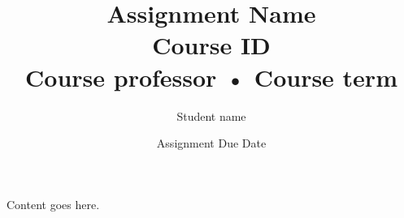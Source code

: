 \documentclass[letterpaper, 12pt]{article}
\newcommand{\noteCourseId}{Course ID}
\newcommand{\noteCourseProfessor}{Course professor}
\newcommand{\noteAuthor}{Student name}
\newcommand{\noteTerm}{Course term}
\begin{document}

\title{Assignment Name \\[0.25em]
	\normalsize\noteCourseId{} \\[1em]
	\noteCourseProfessor{} • \noteTerm{}}


\author{\normalsize\noteAuthor{}}
\date{\vspace{-1em} \normalsize Assignment Due Date}


\maketitle
\tableofcontents\label{sec:contents}


Content goes here.

\end{document}
